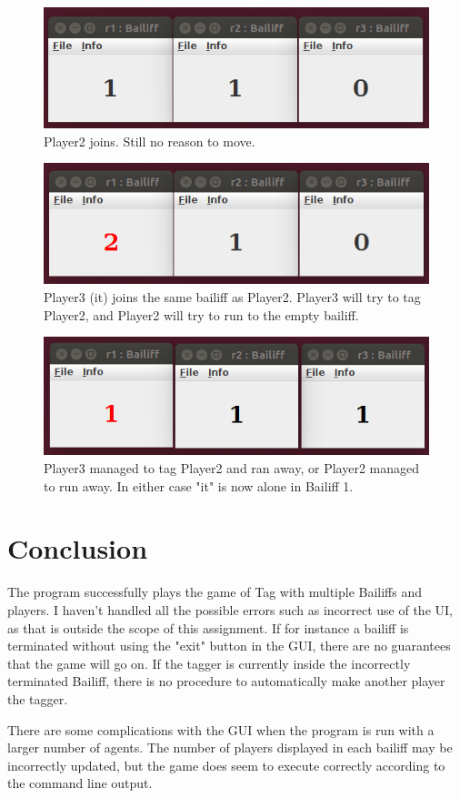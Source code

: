 \documentclass[conference, a4paper]{IEEEtran}
\begin{document}
\begin{figure}[h!]
	\centering
	\includegraphics[scale=0.4]{110}
	\caption{Player2 joins. Still no reason to move.}
	\label{fig110}
\end{figure}

\begin{figure}[h!]
	\centering
	\includegraphics[scale=0.4]{210.png}
	\caption{Player3 (it) joins the same bailiff as Player2. Player3 will try to tag Player2, and Player2 will try to run to the empty bailiff.}
	\label{fig210}
\end{figure}

\begin{figure}[h!]
	\centering
	\includegraphics[scale=0.4]{111}
	\caption{Player3 managed to tag Player2 and ran away, or Player2 managed to run away. In either case "it" is now alone in Bailiff 1.}
	\label{fig111}
\end{figure}

\section{Conclusion}
The program successfully plays the game of Tag with multiple Bailiffs and players. I haven't handled all the possible errors such as incorrect use of the UI, as that is outside the scope of this assignment. If for instance a bailiff is terminated without using the "exit" button in the GUI, there are no guarantees that the game will go on. If the tagger is currently inside the incorrectly terminated Bailiff, there is no procedure to automatically make another player the tagger.

There are some complications with the GUI when the program is run with a larger number of agents. The number of players displayed in each bailiff may be incorrectly updated, but the game does seem to execute correctly according to the command line output.
\end{document}
